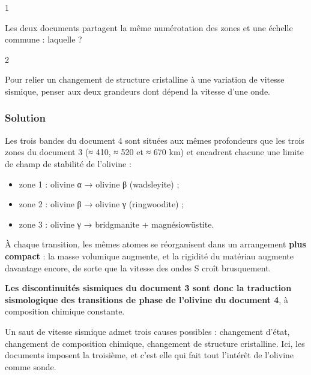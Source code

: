 \documentclass[11pt,a4paper]{article}
\providecommand{\tightlist}{\setlength{\itemsep}{0pt}\setlength{\parskip}{0pt}}
\begin{document}
\begin{indication}{1}

Les deux documents partagent la même numérotation des zones et une échelle commune : laquelle ?

\end{indication}

\begin{indication}{2}

Pour relier un changement de structure cristalline à une variation de vitesse sismique, penser aux deux grandeurs dont dépend la vitesse d'une onde.

\end{indication}

\hypertarget{solution-10}{%
\subsubsection{Solution}\label{solution-10}}

Les trois bandes du document 4 sont situées aux mêmes profondeurs que les trois zones du document 3 (≈ 410, ≈ 520 et ≈ 670 km) et encadrent chacune une limite de champ de stabilité de l'olivine :

\begin{itemize}
\tightlist
\item
  zone 1 : olivine α → olivine β (wadsleyite) ;
\item
  zone 2 : olivine β → olivine γ (ringwoodite) ;
\item
  zone 3 : olivine γ → bridgmanite + magnésiowüstite.
\end{itemize}

À chaque transition, les mêmes atomes se réorganisent dans un arrangement \textbf{plus compact} : la masse volumique augmente, et la rigidité du matériau augmente davantage encore, de sorte que la vitesse des ondes S croît brusquement.

\textbf{Les discontinuités sismiques du document 3 sont donc la traduction sismologique des transitions de phase de l'olivine du document 4}, à composition chimique constante.

\begin{methode}

Un saut de vitesse sismique admet trois causes possibles : changement d'état, changement de composition chimique, changement de structure cristalline. Ici, les documents imposent la troisième, et c'est elle qui fait tout l'intérêt de l'olivine comme sonde.

\end{methode}
\end{document}
